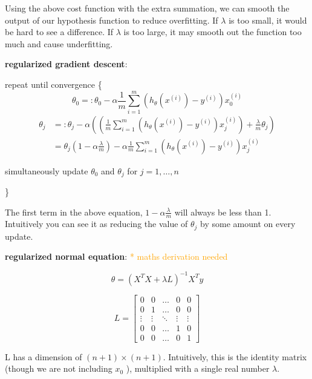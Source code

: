 \documentclass{article}
\begin{document}
\noindent Using the above cost function with the extra summation, we can smooth the output of our hypothesis function to reduce overfitting. If \(\lambda\) is too small, it would be hard to see a difference. If \(\lambda\) is too large, it may smooth out the function too much and cause underfitting.

\bigskip

\noindent \textbf{regularized gradient descent}:

\noindent repeat until convergence \{
\[\theta_0 =: \theta_0 - \alpha \frac{1}{m} \sum_{i = 1}^m (h_{\theta}(x^{(i)}) - y^{(i)}) x^{(i)}_0\]
\begin{equation*}
\begin{split}
\theta_j & =: \theta_j - \alpha ((\frac{1}{m} \sum_{i = 1}^m (h_{\theta}(x^{(i)}) - y^{(i)}) x^{(i)}_j) + \frac{\lambda}{m} \theta_j) \\
 & = \theta_j (1 - \alpha \frac{\lambda}{m}) - \alpha \frac{1}{m} \sum_{i = 1}^m (h_{\theta}(x^{(i)}) - y^{(i)}) x^{(i)}_j
\end{split}
\end{equation*}

\centerline{simultaneously update \(\theta_0\) and \(\theta_j\) for \(j = 1, \dots, n\)}
\}

\bigskip

\noindent The first term in the above equation, \(1 - \alpha \frac{\lambda}{m}\) will always be less than 1. Intuitively you can see it as reducing the value of \(\theta_j\) by some amount on every update.

\bigskip

\noindent \textbf{regularized normal equation}: \textcolor{orange}{ * maths derivation needed}

\[
\theta = (X^TX + \lambda L)^{-1}X^Ty
\]

\[
L = 
\begin{bmatrix}
0 & 0 & \dots & 0 & 0\\
0 & 1 & \dots & 0 & 0\\
\vdots & \vdots & \ddots & \vdots & \vdots\\
0 & 0 & \dots & 1 & 0\\
0 & 0 & \dots & 0 & 1
\end{bmatrix}
\]

\bigskip

\noindent L has a dimension of \((n + 1) \times (n + 1)\). Intuitively, this is the identity matrix (though we are not including \(x_0\) ), multiplied with a single real number \(\lambda\).
\end{document}
